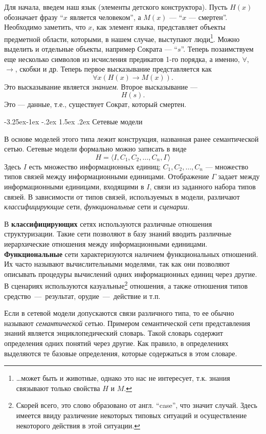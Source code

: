 \documentclass[12pt, openany, twoside]{book} %
\makeatletter
\renewcommand\subsection{\@startsection{subsection}{2}{\z@}%
                                     {-3.25ex\@plus -1ex \@minus -.2ex}%
                                     {1.5ex \@plus .2ex}%
                                     {\normalfont\normalsize\bfseries}}
\makeatother
\begin{document}
Для начала, введем наш язык (элементы детского конструктора). Пусть $H(x)$ обозначает фразу ``$x$ является человеком'', а $M(x)$ --- ``$x$ --- смертен''. Необходимо заметить, что $x$, как элемент языка, представляет объекты предметной области, которыми, в нашем случае, выступают люди\footnote{\ldots может быть и животные, однако это нас не интересует, т.к. знания связывают только свойства $H$ и $M$.}. Можно выделить и отдельные объекты, например Сократа --- ``$s$''. Теперь позаимствуем еще несколько символов из исчисления предикатов 1-го порядка, а именно, $\forall$, $\to$, скобки и др. Теперь первое высказывание представляется как
$$
\forall x \left(H(x)\to M(x)\right).
$$
Это высказывание является {\em знанием}. Второе высказывание ---
$$
H(s).
$$
Это --- данные, т.е., существует Сократ, который смертен.

\subsection{Сетевые модели}

В основе моделей этого типа лежит конструкция, названная ранее семантической сетью. Сетевые модели формально можно записать в виде
$$
    H=\langle I, C_1, C_2, \ldots, C_n, \Gamma\rangle
$$
Здесь $I$ есть множество информационных единиц; $C_1, C_2, \ldots, C_n$ --- множество типов связей между информационными единицами. Отображение $\Gamma$ задает между информационными единицами, входящими в $I$, связи из заданного набора типов связей. В зависимости от типов связей, используемых в модели, различают {\em классифицирующие} сети, {\em функциональные} сети и {\em сценарии}.

В {\bf классифицирующих} сетях используются различные отношения структуризации. Такие сети позволяют в базу знаний вводить различные иерархические отношения между информационными единицами. {\bf Функциональные} сети характеризуются наличием функциональных отношений. Их часто называют вычислительными моделями, так как они позволяют описывать процедуры вычислений одних информационных единиц через другие. В сценариях используются казуальные\footnote{Скорей всего, это слово образовано от англ. ``case'', что значит случай. Здесь имеется ввиду различение некоторых типовых ситуаций и осуществление некоторого действия в этой ситуации.} отношения, а также отношения типов средство~---~результат, орудие~---~действие и т.п.

Если в сетевой модели допускаются связи различного типа, то ее обычно называют {\em семантической} сетью. Примером семантической сети представления знаний является энциклопедический словарь. Такой словарь содержит определения одних понятий через другие. Как правило, в определениях выделяются те базовые определения, которые содержаться в этом словаре.
\end{document}
